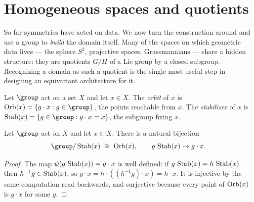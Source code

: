 \section{Homogeneous spaces and quotients}
\label{sec:found:homogeneous}

So far symmetries have acted on data. We now turn the construction around and use
a group to \emph{build} the domain itself. Many of the spaces on which geometric
data lives --- the sphere $S^2$, projective spaces, Grassmannians --- share a
hidden structure: they are quotients $G/H$ of a Lie group by a closed subgroup.
Recognizing a domain as such a quotient is the single most useful step in
designing an equivariant architecture for it.

\begin{definition}
\label{def:found:orbit}
Let $\group$ act on a set $X$ and let $x \in X$. The \emph{orbit} of $x$ is
$\Orb(x) = \{g \cdot x : g \in \group\}$, the points reachable from $x$. The
\emph{stabilizer} of $x$ is $\Stab(x) = \{g \in \group : g \cdot x = x\}$, the
subgroup fixing $x$.
\end{definition}

\begin{theorem}
\label{thm:found:orbitstab}
Let $\group$ act on $X$ and let $x \in X$. There is a natural bijection
\[
  \group / \Stab(x) \;\cong\; \Orb(x), \qquad g\,\Stab(x) \mapsto g \cdot x.
\]
\end{theorem}

\begin{proof}
The map $\psi(g\,\operatorname{Stab}(x)) = g\cdot x$ is well defined: if $g\,\operatorname{Stab}(x) =
h\,\operatorname{Stab}(x)$ then $h^{-1}g \in \operatorname{Stab}(x)$, so $g\cdot x = h\cdot((h^{-1}g)\cdot x)
= h\cdot x$. It is injective by the same computation read backwards, and
surjective because every point of $\operatorname{Orb}(x)$ is $g\cdot x$ for some $g$.
\end{proof}

